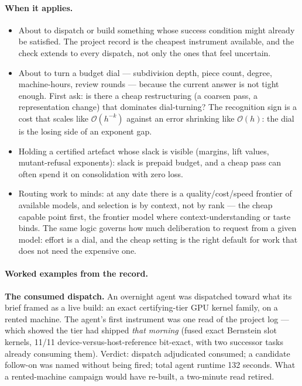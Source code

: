 \paragraph{When it applies.}
\begin{itemize}
\item About to dispatch or build something whose success condition
  might already be satisfied. The project record is the cheapest
  instrument available, and the check extends to every dispatch, not
  only the ones that feel uncertain.
\item About to turn a budget dial --- subdivision depth, piece count,
  degree, machine-hours, review rounds --- because the current answer is
  not tight enough. First ask: is there a cheap restructuring (a
  coarsen pass, a representation change) that dominates dial-turning?
  The recognition sign is a cost that scales like
  $\mathcal{O}(h^{-k})$ against an error shrinking like
  $\mathcal{O}(h)$: the dial is the losing side of an exponent gap.
\item Holding a certified artefact whose slack is visible (margins,
  lift values, mutant-refusal exponents): slack is prepaid budget, and
  a cheap pass can often spend it on consolidation with zero loss.
\item Routing work to minds: at any date there is a quality/cost/speed
  frontier of available models, and selection is by context, not by
  rank --- the cheap capable point first, the frontier model where
  context-understanding or taste binds. The same logic governs how
  much deliberation to request from a given model: effort is a dial,
  and the cheap setting is the right default for work that does not
  need the expensive one.
\end{itemize}

\paragraph{Worked examples from the record.}

\textbf{The consumed dispatch.} An overnight agent was dispatched
toward what its brief framed as a live build: an exact certifying-tier
GPU kernel family, on a rented machine. The agent's first instrument was
one read of the project log --- which showed the tier had shipped
\emph{that morning} (fused exact Bernstein slot kernels, 11/11
device-versus-host-reference bit-exact, with two successor tasks
already consuming them). Verdict: dispatch adjudicated consumed; a
candidate follow-on was named without being fired; total agent runtime
132 seconds. What a rented-machine campaign would have re-built, a
two-minute read retired.

